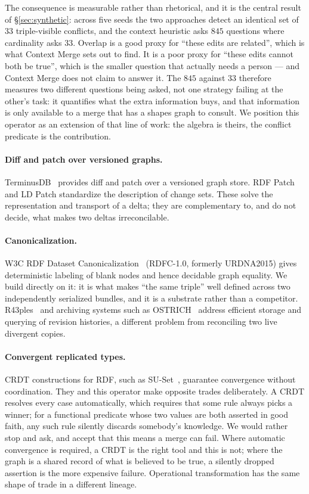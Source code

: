 The consequence is measurable rather than rhetorical, and it is the central
result of \S\ref{sec:synthetic}: across five seeds the two approaches detect an
identical set of $33$ triple-visible conflicts, and the context heuristic asks
$845$ questions where cardinality asks $33$. Overlap is a good proxy for ``these
edits are related'', which is what Context Merge sets out to find. It is a poor
proxy for ``these edits cannot both be true'', which is the smaller question that
actually needs a person --- and Context Merge does not claim to answer it. The
$845$ against $33$ therefore measures two different questions being asked, not
one strategy failing at the other's task: it quantifies what the extra
information buys, and that information is only available to a merge that has a
shapes graph to consult. We position this operator as an extension of that line
of work: the algebra is theirs, the conflict predicate is the contribution.

\paragraph{Diff and patch over versioned graphs.} TerminusDB~\cite{terminusdb} provides diff and
patch over a versioned graph store. RDF Patch and LD Patch standardize the
description of change sets. These solve the representation and transport of a
delta; they are complementary to, and do not decide, what makes two deltas
irreconcilable.

\paragraph{Canonicalization.} W3C RDF Dataset Canonicalization~\cite{rdfc2024} (RDFC-1.0,
formerly URDNA2015) gives deterministic labeling of blank nodes and hence
decidable graph equality. We build directly on it: it is what makes ``the same
triple'' well defined across two independently serialized bundles, and it is a
substrate rather than a competitor. R43ples~\cite{graube2016r43ples} and archiving systems such as
OSTRICH~\cite{taelman2018ostrich} address efficient storage and querying of revision histories, a
different problem from reconciling two live divergent copies.

\paragraph{Convergent replicated types.} CRDT constructions for RDF, such as
SU-Set~\cite{ibanez2012suset}, guarantee convergence without coordination. They and this operator make
opposite trades deliberately. A CRDT resolves every case automatically, which
requires that some rule always picks a winner; for a functional predicate whose
two values are both asserted in good faith, any such rule silently discards
somebody's knowledge. We would rather stop and ask, and accept that this means
a merge can fail. Where automatic convergence is required, a CRDT is the right
tool and this is not; where the graph is a shared record of what is believed to
be true, a silently dropped assertion is the more expensive failure. Operational
transformation has the same shape of trade in a different lineage.

